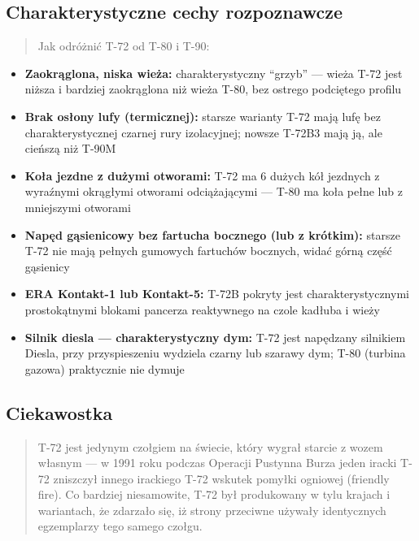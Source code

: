 \documentclass[12pt,oneside]{book}
\providecommand{\tightlist}{%
  \setlength{\itemsep}{0pt}\setlength{\parskip}{0pt}}
\begin{document}
\subsection{Charakterystyczne cechy
rozpoznawcze}\label{charakterystyczne-cechy-rozpoznawcze-3}

\begin{quote}
Jak odróżnić T-72 od T-80 i T-90:
\end{quote}

\begin{itemize}
\tightlist
\item
  \textbf{Zaokrąglona, niska wieża:} charakterystyczny ``grzyb'' ---
  wieża T-72 jest niższa i bardziej zaokrąglona niż wieża T-80, bez
  ostrego podciętego profilu
\item
  \textbf{Brak osłony lufy (termicznej):} starsze warianty T-72 mają
  lufę bez charakterystycznej czarnej rury izolacyjnej; nowsze T-72B3
  mają ją, ale cieńszą niż T-90M
\item
  \textbf{Koła jezdne z dużymi otworami:} T-72 ma 6 dużych kół jezdnych
  z wyraźnymi okrągłymi otworami odciążającymi --- T-80 ma koła pełne
  lub z mniejszymi otworami
\item
  \textbf{Napęd gąsienicowy bez fartucha bocznego (lub z krótkim):}
  starsze T-72 nie mają pełnych gumowych fartuchów bocznych, widać górną
  część gąsienicy
\item
  \textbf{ERA Kontakt-1 lub Kontakt-5:} T-72B pokryty jest
  charakterystycznymi prostokątnymi blokami pancerza reaktywnego na
  czole kadłuba i wieży
\item
  \textbf{Silnik diesla --- charakterystyczny dym:} T-72 jest napędzany
  silnikiem Diesla, przy przyspieszeniu wydziela czarny lub szarawy dym;
  T-80 (turbina gazowa) praktycznie nie dymuje
\end{itemize}

\subsection{Ciekawostka}\label{ciekawostka-3}

\begin{quote}
T-72 jest jedynym czołgiem na świecie, który wygrał starcie z wozem
własnym --- w 1991 roku podczas Operacji Pustynna Burza jeden iracki
T-72 zniszczył innego irackiego T-72 wskutek pomyłki ogniowej (friendly
fire). Co bardziej niesamowite, T-72 był produkowany w tylu krajach i
wariantach, że zdarzało się, iż strony przeciwne używały identycznych
egzemplarzy tego samego czołgu.
\end{quote}
\end{document}
